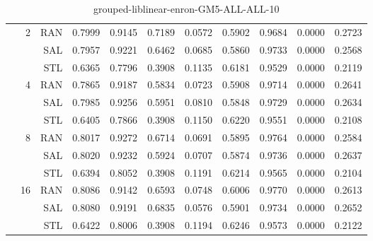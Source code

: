 \begin{center}
\begin{table}[htbp]
\begin{tabular}{ | r | r | r | r | r | r | r | r | r | r | r |}
 & \multirow{3}{*}{2} & RAN & 0.7999 & 0.9145 & 0.7189 & 0.0572 & 0.5902 & 0.9684 & 0.0000 & 0.2723\\ \cline{3-11}
 &   & SAL & 0.7957 & 0.9221 & 0.6462 & 0.0685 & 0.5860 & 0.9733 & 0.0000 & 0.2568\\ \cline{3-11}
 &   & STL & 0.6365 & 0.7796 & 0.3908 & 0.1135 & 0.6181 & 0.9529 & 0.0000 & 0.2119\\ \cline{2-11}
 & \multirow{3}{*}{4} & RAN & 0.7865 & 0.9187 & 0.5834 & 0.0723 & 0.5908 & 0.9714 & 0.0000 & 0.2641\\ \cline{3-11}
 &   & SAL & 0.7985 & 0.9256 & 0.5951 & 0.0810 & 0.5848 & 0.9729 & 0.0000 & 0.2634\\ \cline{3-11}
 &   & STL & 0.6405 & 0.7866 & 0.3908 & 0.1150 & 0.6220 & 0.9551 & 0.0000 & 0.2108\\ \cline{2-11}
 & \multirow{3}{*}{8} & RAN & 0.8017 & 0.9272 & 0.6714 & 0.0691 & 0.5895 & 0.9764 & 0.0000 & 0.2584\\ \cline{3-11}
 &   & SAL & 0.8020 & 0.9232 & 0.5924 & 0.0707 & 0.5874 & 0.9736 & 0.0000 & 0.2637\\ \cline{3-11}
 &   & STL & 0.6394 & 0.8052 & 0.3908 & 0.1191 & 0.6214 & 0.9565 & 0.0000 & 0.2104\\ \cline{2-11}
 & \multirow{3}{*}{16} & RAN & 0.8086 & 0.9142 & 0.6593 & 0.0748 & 0.6006 & 0.9770 & 0.0000 & 0.2613\\ \cline{3-11}
 &   & SAL & 0.8080 & 0.9191 & 0.6835 & 0.0576 & 0.5901 & 0.9734 & 0.0000 & 0.2652\\ \cline{3-11}
 &   & STL & 0.6422 & 0.8006 & 0.3908 & 0.1194 & 0.6246 & 0.9573 & 0.0000 & 0.2122\\ \cline{2-11}
\hline
\end{tabular}
\caption{grouped-liblinear-enron-GM5-ALL-ALL-10}
\end{table}
\end{center}

